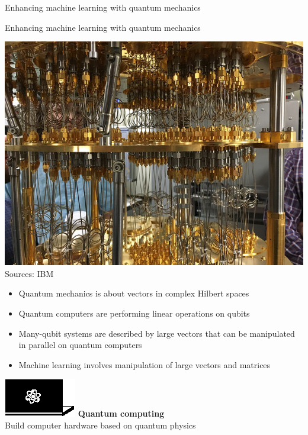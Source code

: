 \documentclass[10pt]{beamer}
\begin{document}
{\begin{frame}[fragile]{Enhancing machine learning with quantum mechanics}
\end{frame}
}

{
\begin{frame}[fragile]{Enhancing machine learning with quantum mechanics}
\hspace{-0.7cm}
\begin{minipage}[c]{0.59\textwidth}
\centering
\includegraphics[scale=0.16]{ibm-quantum-computer.jpg}\\
\tiny{Sources: IBM}
\vspace{0.1cm}
\flushleft
\normalsize
\begin{itemize}
\item Quantum mechanics is about vectors in complex Hilbert spaces
\item Quantum computers are performing linear operations on qubits
\item Many-qubit systems are described by large vectors that can be manipulated in parallel on quantum computers
\item Machine learning involves manipulation of large vectors and matrices
\end{itemize}
\end{minipage}%
\hspace{0.3cm}
\begin{minipage}[c]{0.39\textwidth}
\vspace{2.8cm}
\centering
\hspace{-1cm}\includegraphics[scale=2.2]{Vectors/laptop_q.eps}
\flushleft
\textbf{Quantum computing}\\
Build computer hardware based on quantum physics
\end{minipage}

\end{frame}
}
\end{document}
